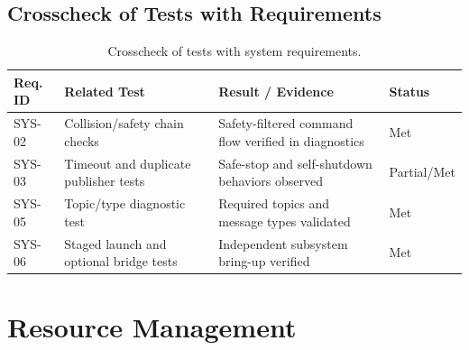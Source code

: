 \documentclass[12pt,a4paper]{report}
\begin{document}
\section{Crosscheck of Tests with Requirements}
\begin{table}[H]
\centering
\caption{Crosscheck of tests with system requirements.}
\label{tab:test_crosscheck}
\begin{tabularx}{\textwidth}{|p{2cm}|p{3cm}|X|p{2cm}|}
\hline
\textbf{Req. ID} & \textbf{Related Test} & \textbf{Result / Evidence} & \textbf{Status} \\
\hline
SYS-02 & Collision/safety chain checks & Safety-filtered command flow verified in diagnostics & Met \\
\hline
SYS-03 & Timeout and duplicate publisher tests & Safe-stop and self-shutdown behaviors observed & Partial/Met \\
\hline
SYS-05 & Topic/type diagnostic test & Required topics and message types validated & Met \\
\hline
SYS-06 & Staged launch and optional bridge tests & Independent subsystem bring-up verified & Met \\
\hline
\end{tabularx}
\end{table}

\chapter{Resource Management}
\end{document}

